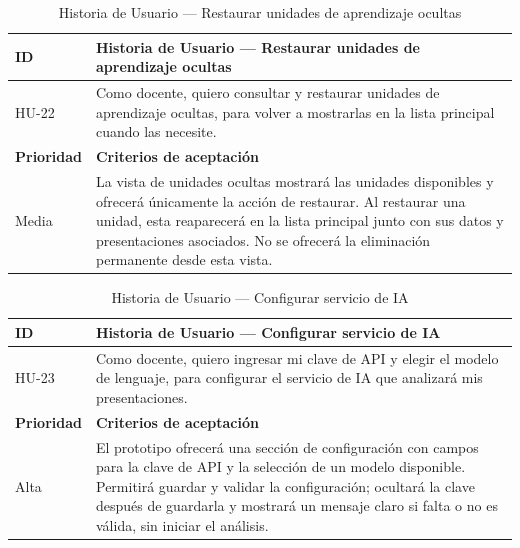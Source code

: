 \documentclass[11pt]{article}
\begin{document}
\begin{table}[H]
    \centering
    \renewcommand{\arraystretch}{1.2}
    \begin{tabular}{|p{2.5cm}|p{11cm}|}
        \hline
        \textbf{ID} & \textbf{Historia de Usuario --- Restaurar unidades de aprendizaje ocultas} \\
        \hline
        HU-22 & Como docente, quiero consultar y restaurar unidades de aprendizaje ocultas, para volver a mostrarlas en la lista principal cuando las necesite. \\
        \hline
        \textbf{Prioridad} & \textbf{Criterios de aceptación} \\
        \hline
        Media & La vista de unidades ocultas mostrará las unidades disponibles y ofrecerá únicamente la acción de restaurar. Al restaurar una unidad, esta reaparecerá en la lista principal junto con sus datos y presentaciones asociados. No se ofrecerá la eliminación permanente desde esta vista. \\
        \hline
    \end{tabular}
    \caption{Historia de Usuario --- Restaurar unidades de aprendizaje ocultas}
    \label{tab:hu-restaurar-unidades-ocultas}
\end{table}

\begin{table}[H]
    \centering
    \renewcommand{\arraystretch}{1.2}
    \begin{tabular}{|p{2.5cm}|p{11cm}|}
        \hline
        \textbf{ID} & \textbf{Historia de Usuario --- Configurar servicio de IA} \\
        \hline
        HU-23 & Como docente, quiero ingresar mi clave de API y elegir el modelo de lenguaje, para configurar el servicio de IA que analizará mis presentaciones. \\
        \hline
        \textbf{Prioridad} & \textbf{Criterios de aceptación} \\
        \hline
        Alta & El prototipo ofrecerá una sección de configuración con campos para la clave de API y la selección de un modelo disponible. Permitirá guardar y validar la configuración; ocultará la clave después de guardarla y mostrará un mensaje claro si falta o no es válida, sin iniciar el análisis. \\
        \hline
    \end{tabular}
    \caption{Historia de Usuario --- Configurar servicio de IA}
    \label{tab:hu-configurar-servicio-ia}
\end{table}
\end{document}

